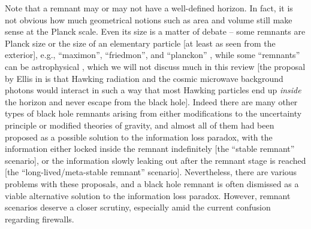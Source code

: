 \documentclass[12pt]{article}
\newcommand{\2}{$^2$}
\newcommand{\3}{$^3$}
\newcommand{\4}{$_4$}
\newcommand{\5}{$_5$}
\begin{document}
Note that a remnant may or may not have a well-defined horizon. In fact, it is not obvious how much geometrical notions such as area and volume still make sense at the Planck scale. Even its size is a matter of debate -- some remnants are Planck size or the size of an elementary particle [at least as seen from the exterior], e.g., ``maximon'', ``friedmon'', and ``planckon'' \cite{ACN, markov1, markov2, markov3, MM0, MM}, while some ``remnants'' can be astrophysical \cite{ellis}, which we will not discuss much in this review [the proposal by Ellis in \cite{ellis} is that Hawking radiation and the cosmic microwave background photons would interact in such a way that most Hawking particles end up \emph{inside} the horizon and never escape from the black hole].  %
Indeed there are many other types of black hole remnants arising from either modifications to the uncertainty principle or modified theories of gravity, and almost all of them had been proposed as a possible solution to the information loss paradox, with the information either locked inside the remnant indefinitely [the ``stable remnant'' scenario], or the information slowly leaking out after the remnant stage is reached [the ``long-lived/meta-stable remnant'' scenario]. Nevertheless, there are various problems with these proposals, and a black hole remnant is often dismissed as a viable alternative solution to the information loss paradox. However, remnant scenarios deserve a closer scrutiny, especially amid the current confusion regarding firewalls. 
\end{document}
